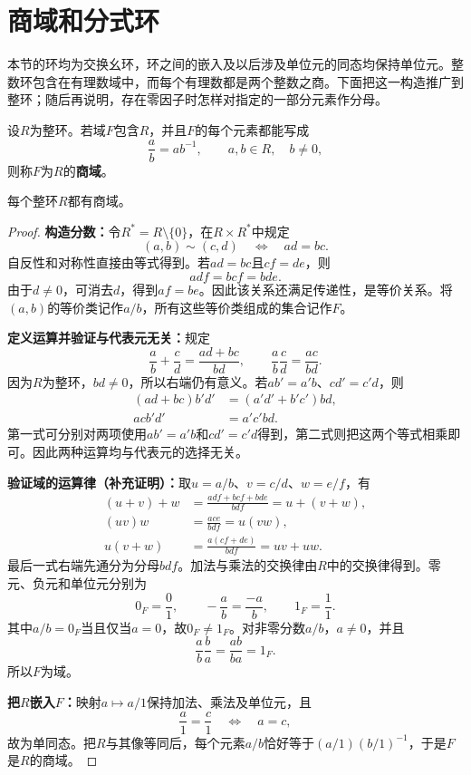 \section{商域和分式环}

本节的环均为交换幺环，环之间的嵌入及以后涉及单位元的同态均保持单位元。整数环包含在有理数域中，而每个有理数都是两个整数之商。下面把这一构造推广到整环；随后再说明，存在零因子时怎样对指定的一部分元素作分母。

\begin{definition}
设$R$为整环。若域$F$包含$R$，并且$F$的每个元素都能写成
\[
\frac ab=ab^{-1},\qquad a,b\in R,\quad b\ne0,
\]
则称$F$为$R$的\textbf{商域}。
\end{definition}

\begin{theorem}\label{p2:fraction-field}
每个整环$R$都有商域。
\end{theorem}
\begin{proof}
\textbf{构造分数：}令$R^*=R\setminus\{0\}$，在$R\times R^*$中规定
\[
(a,b)\sim(c,d)\quad\Longleftrightarrow\quad ad=bc.
\]
自反性和对称性直接由等式得到。若$ad=bc$且$cf=de$，则
\[
adf=bcf=bde.
\]
由于$d\ne0$，可消去$d$，得到$af=be$。因此该关系还满足传递性，是等价关系。将$(a,b)$的等价类记作$a/b$，所有这些等价类组成的集合记作$F$。

\textbf{定义运算并验证与代表元无关：}规定
\[
\frac ab+\frac cd=\frac{ad+bc}{bd},\qquad
\frac ab\frac cd=\frac{ac}{bd}.
\]
因为$R$为整环，$bd\ne0$，所以右端仍有意义。若$ab'=a'b$、$cd'=c'd$，则
\begin{align*}
(ad+bc)b'd'&=(a'd'+b'c')bd,\\
acb'd'&=a'c'bd.
\end{align*}
第一式可分别对两项使用$ab'=a'b$和$cd'=c'd$得到，第二式则把这两个等式相乘即可。因此两种运算均与代表元的选择无关。

\textbf{验证域的运算律（补充证明）：}取$u=a/b$、$v=c/d$、$w=e/f$，有
\begin{align*}
(u+v)+w&=\frac{adf+bcf+bde}{bdf}=u+(v+w),\\
(uv)w&=\frac{ace}{bdf}=u(vw),\\
u(v+w)&=\frac{a(cf+de)}{bdf}=uv+uw.
\end{align*}
最后一式右端先通分为分母$bdf$。加法与乘法的交换律由$R$中的交换律得到。零元、负元和单位元分别为
\[
0_F=\frac01,\qquad -\frac ab=\frac{-a}{b},\qquad 1_F=\frac11.
\]
其中$a/b=0_F$当且仅当$a=0$，故$0_F\ne1_F$。对非零分数$a/b$，$a\ne0$，并且
\[
\frac ab\frac ba=\frac{ab}{ba}=1_F.
\]
所以$F$为域。

\textbf{把$R$嵌入$F$：}映射$a\mapsto a/1$保持加法、乘法及单位元，且
\[
\frac a1=\frac c1\quad\Longleftrightarrow\quad a=c,
\]
故为单同态。把$R$与其像等同后，每个元素$a/b$恰好等于$(a/1)(b/1)^{-1}$，于是$F$是$R$的商域。
\end{proof}

